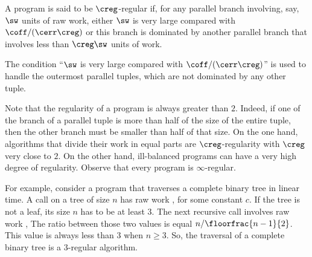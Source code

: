 \begin{definition}
A program is said to be $\creg$-regular if,
for any parallel branch involving, say, $\sw$ units of raw work, 
either $\sw$ is very large compared with $\coff/(\cerr\creg)$
or this branch is dominated by another parallel branch
that involves less than $\creg\sw$ units of work.
\end{definition}
%
The condition ``$\sw$ is very large compared with $\coff/(\cerr\creg)$''
is used to handle the outermost parallel tuples, which are not
dominated by any other tuple. 

Note that the regularity of a program is always greater than $2$.
Indeed, if one of the branch of a parallel tuple is more
than half of the size of the entire tuple, then the other 
branch must be smaller than half of that size.
On the one hand, algorithms that divide their work in 
equal parts are $\creg$-regularity with $\creg$ very close to $2$.
On the other hand, ill-balanced programs can have a very
high degree of regularity. Observe that every program is $\infty$-regular.

For example, consider a program that traverses a complete binary tree
in linear time. A call on a tree of size $n$ 
has raw work , for some constant $c$.
If the tree is not a leaf, its size $n$ has to be at least $3$.
The next recursive call involves raw work ,
The ratio between those two values is equal $n / \floorfrac{n-1}{2}$.
This value is always less than $3$ when $n\geq 3$.
So, the traversal of a complete binary tree is a 3-regular algorithm.


